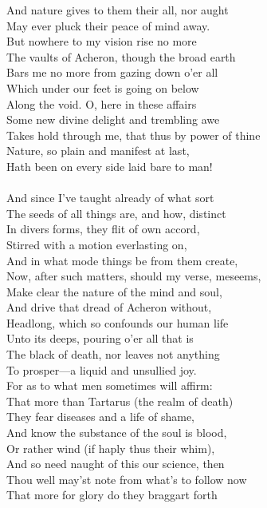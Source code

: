 And nature gives to them their all, nor aught\\
May ever pluck their peace of mind away.\\
But nowhere to my vision rise no more\\
The vaults of Acheron, though the broad earth\\
Bars me no more from gazing down o'er all\\
Which under our feet is going on below\\
Along the void. O, here in these affairs\\
Some new divine delight and trembling awe\\
Takes hold through me, that thus by power of thine\\
Nature, so plain and manifest at last,\\
Hath been on every side laid bare to man!\\
\\
And since I've taught already of what sort\\
The seeds of all things are, and how, distinct\\
In divers forms, they flit of own accord,\\
Stirred with a motion everlasting on,\\
And in what mode things be from them create,\\
Now, after such matters, should my verse, meseems,\\
Make clear the nature of the mind and soul,\\
And drive that dread of Acheron without,\\
Headlong, which so confounds our human life\\
Unto its deeps, pouring o'er all that is\\
The black of death, nor leaves not anything\\
To prosper—a liquid and unsullied joy.\\
For as to what men sometimes will affirm:\\
That more than Tartarus (the realm of death)\\
They fear diseases and a life of shame,\\
And know the substance of the soul is blood,\\
Or rather wind (if haply thus their whim),\\
And so need naught of this our science, then\\
Thou well may'st note from what's to follow now\\
That more for glory do they braggart forth\\
